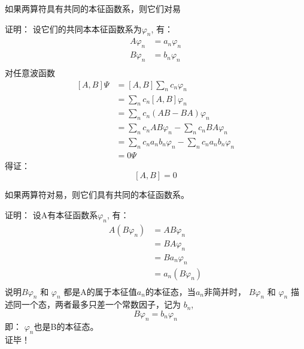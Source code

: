 \begin{frame} [allowframebreaks=]
    \begin{tcolorbox}[colback=yellow!5,colframe=yellow!75!black,title=定理1：]
        如果两算符具有共同的本征函数系，则它们对易
    \end{tcolorbox}
    \alert{证明：} 设它们的共同本本征函数系为{$\varphi_n$}, 有：\\ 
        \begin{equation*}
            \begin{split} 
            A\varphi_n&=a_n \varphi_n \\
            B\varphi_n&=b_n \varphi_n \\
            \end{split}  
        \end{equation*}  
        对任意波函数
        \begin{equation*}
            \begin{split} 
            [A,B]\Psi &= [A,B]\sum_n c_n \varphi_n \\
            &= \sum_n c_n [A,B]\varphi_n \\
            &= \sum_n c_n (AB-BA)\varphi_n\\
            &= \sum_n c_n AB\varphi_n- \sum_n c_n BA\varphi_n\\
            &= \sum_n c_n a_nb_n\varphi_n- \sum_n c_n a_nb_n\varphi_n\\
            &=0\Psi
            \end{split}  
        \end{equation*}  
        得证： $$[A,B]=0$$
\end{frame} 

\begin{frame} [allowframebreaks=]
    \begin{tcolorbox}[colback=yellow!5,colframe=yellow!75!black,title=逆定理：]
        如果两算符对易，则它们具有共同的本征函数系。
    \end{tcolorbox}
    \alert{证明：} 设A有本征函数系{$\varphi_n$}, 有：\\ 
        \begin{equation*}
            \begin{split} 
            A(B\varphi_n)&= AB\varphi_n\\
            &=BA\varphi_n \\
            &=Ba_n\varphi_n \\
            &=a_n(B\varphi_n) \\
            \end{split}  
        \end{equation*}  
        说明$B\varphi_n$ 和 $\varphi_n$ 都是A的属于本征值$a_n$的本征态，当$a_n$非简并时， 
        $B\varphi_n$ 和 $\varphi_n$ 描述同一个态，两者最多只差一个常数因子，记为 $b_n$,
        $$ B\varphi_n=b_n \varphi_n$$
        即： $\varphi_n$也是B的本征态。\\
        证毕！
\end{frame} 

